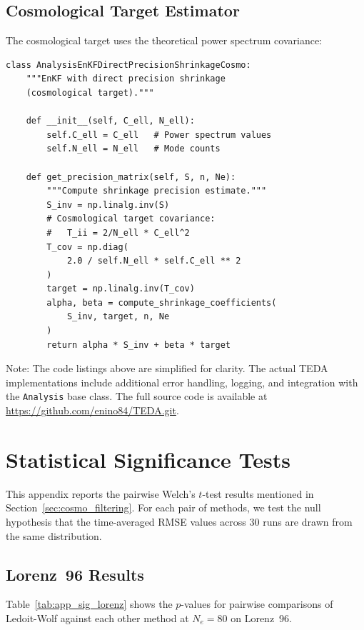 \section{Cosmological Target Estimator}

The cosmological target uses the theoretical power spectrum covariance:

\begin{verbatim}
class AnalysisEnKFDirectPrecisionShrinkageCosmo:
    """EnKF with direct precision shrinkage
    (cosmological target)."""

    def __init__(self, C_ell, N_ell):
        self.C_ell = C_ell   # Power spectrum values
        self.N_ell = N_ell   # Mode counts

    def get_precision_matrix(self, S, n, Ne):
        """Compute shrinkage precision estimate."""
        S_inv = np.linalg.inv(S)
        # Cosmological target covariance:
        #   T_ii = 2/N_ell * C_ell^2
        T_cov = np.diag(
            2.0 / self.N_ell * self.C_ell ** 2
        )
        target = np.linalg.inv(T_cov)
        alpha, beta = compute_shrinkage_coefficients(
            S_inv, target, n, Ne
        )
        return alpha * S_inv + beta * target
\end{verbatim}

Note: The code listings above are simplified for clarity. The actual TEDA implementations include additional error handling, logging, and integration with the \texttt{Analysis} base class. The full source code is available at \url{https://github.com/enino84/TEDA.git}.

\chapter{Statistical Significance Tests}
\label{app:significance}

This appendix reports the pairwise Welch's $t$-test results mentioned in Section~\ref{sec:cosmo_filtering}. For each pair of methods, we test the null hypothesis that the time-averaged RMSE values across 30 runs are drawn from the same distribution.

\section{Lorenz~96 Results}

Table~\ref{tab:app_sig_lorenz} shows the $p$-values for pairwise comparisons of Ledoit-Wolf against each other method at $N_e = 80$ on Lorenz~96.

